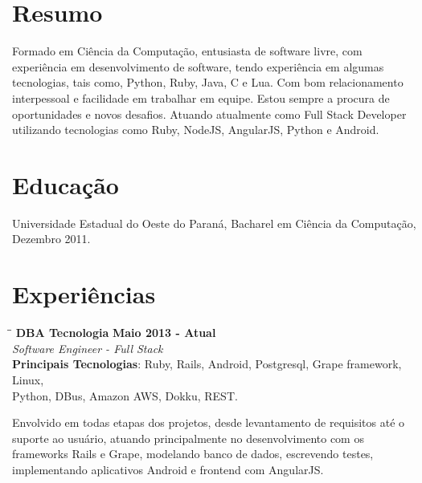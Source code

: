 \documentclass[margin]{res}
\begin{document}

\address{Florianópolis, SC \\ cadicallegari@gmail.com \\ Telefone: (48) 9826 4067}


\begin{resume}

\section{Resumo}       Formado em Ciência da Computação, entusiasta de software livre, com experiência em desenvolvimento de software, tendo experiência em algumas tecnologias, tais como, Python, Ruby, Java, C e Lua. Com bom relacionamento interpessoal e facilidade em trabalhar em equipe. Estou sempre a procura de oportunidades e novos desafios.
Atuando atualmente como Full Stack Developer utilizando tecnologias como Ruby, NodeJS, AngularJS, Python e Android.

\section{Educação}	Universidade Estadual do Oeste do Paraná, Bacharel em Ciência da Computação, Dezembro 2011.

\section{Experiências}

\vspace{-0.1in}
   \begin{tabbing}
   \hspace{2.3in}\= \hspace{1.7in}\= \kill %
    \textbf{DBA Tecnologia}    \>\>\textbf{Maio 2013 - Atual}\\
    \textit{Software Engineer - Full Stack}\\
    \textbf{Principais Tecnologias}: Ruby, Rails, Android, Postgresql, Grape framework, Linux,\\ Python, DBus, Amazon AWS, Dokku, REST.
   \end{tabbing}\vspace{-20pt}      %
    \vspace{2mm}
    
	Envolvido em todas etapas dos projetos, desde levantamento de requisitos até o suporte ao usuário, atuando principalmente no desenvolvimento com os frameworks Rails e Grape, modelando banco de dados, escrevendo testes, implementando aplicativos Android e frontend com AngularJS.


\end{resume}
\end{document}
